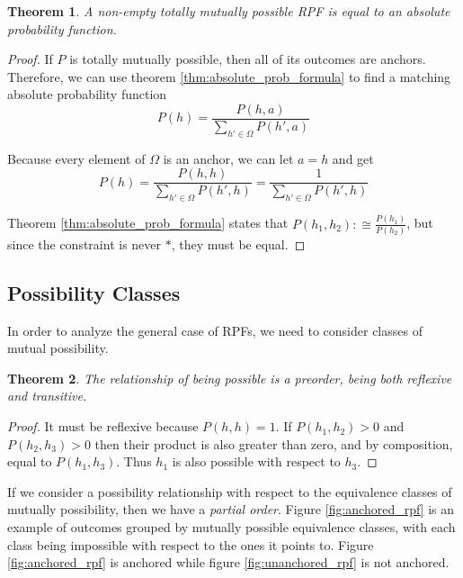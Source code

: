 \documentclass[twoside]{article}
\theoremstyle{plain}%
\newtheorem{theorem}{Theorem}[section]
\theoremstyle{definition}
\theoremstyle{remark}
\begin{document}
\begin{theorem}
A non-empty totally mutually possible RPF is equal to an absolute probability function.
\end{theorem}

\begin{proof}
If \(P\) is totally mutually possible, then all of its outcomes are anchors. Therefore, we can use theorem \ref{thm:absolute_prob_formula} to find a matching absolute probability function
\[P(h) = \frac{P(h, a)}{\sum_{h' \in \Omega}P(h', a)}\]

Because every element of \(\Omega\) is an anchor, we can let \(a = h\) and get
\[P(h) = \frac{P(h, h)}{\sum_{h' \in \Omega}P(h', h)}=\frac{1}{\sum_{h' \in \Omega}P(h', h)}\]

Theorem \ref{thm:absolute_prob_formula} states that \(P(h_1, h_2) :\cong \frac{P(h_1)}{P(h_2)}\), but since the constraint is never \(\ast\), they must be equal.
\end{proof}

\subsection{Possibility Classes}
\label{section:possibility_classes}

In order to analyze the general case of RPFs, we need to consider classes of mutual possibility.

\begin{theorem}
The relationship of being possible is a \textit{preorder}, being both reflexive and transitive.
\end{theorem}

\begin{proof}
It must be reflexive because \(P(h, h) = 1\). If \(P(h_1, h_2) > 0\) and \(P(h_2, h_3) > 0\) then their product is also greater than zero, and by composition, equal to \(P(h_1, h_3)\). Thus \(h_1\) is also possible with respect to \(h_3\).
\end{proof}

If we consider a possibility relationship with respect to the equivalence classes of mutually possibility, then we have a \textit{partial order}. Figure \ref{fig:anchored_rpf} is an example of outcomes grouped by mutually possible equivalence classes, with each class being impossible with respect to the ones it points to. Figure \ref{fig:anchored_rpf} is anchored while figure \ref{fig:unanchored_rpf} is not anchored.
\end{document}
